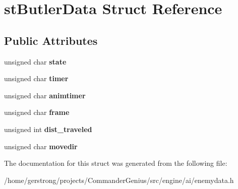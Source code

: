 \hypertarget{structst_butler_data}{
\section{stButlerData Struct Reference}
\label{structst_butler_data}
}
\subsection*{Public Attributes}
\begin{DoxyCompactItemize}
\item 
\hypertarget{structst_butler_data_ad56c17661e5c9b28421bcbd7e271b579}{
unsigned char {\bfseries state}}
\label{structst_butler_data_ad56c17661e5c9b28421bcbd7e271b579}

\item 
\hypertarget{structst_butler_data_af3914f6f6878a60578ace01b501d5973}{
unsigned char {\bfseries timer}}
\label{structst_butler_data_af3914f6f6878a60578ace01b501d5973}

\item 
\hypertarget{structst_butler_data_a2dcdd6d2656d95311bffea2f404c4955}{
unsigned char {\bfseries animtimer}}
\label{structst_butler_data_a2dcdd6d2656d95311bffea2f404c4955}

\item 
\hypertarget{structst_butler_data_ae1639d07feae07a2f63e52548db858a9}{
unsigned char {\bfseries frame}}
\label{structst_butler_data_ae1639d07feae07a2f63e52548db858a9}

\item 
\hypertarget{structst_butler_data_a9b18b251c37b61ed5a40308fa3b20cf2}{
unsigned int {\bfseries dist\_\-traveled}}
\label{structst_butler_data_a9b18b251c37b61ed5a40308fa3b20cf2}

\item 
\hypertarget{structst_butler_data_a336d7bd497c0bf3eb622d381da472cbd}{
unsigned char {\bfseries movedir}}
\label{structst_butler_data_a336d7bd497c0bf3eb622d381da472cbd}

\end{DoxyCompactItemize}


The documentation for this struct was generated from the following file:\begin{DoxyCompactItemize}
\item 
/home/gerstrong/projects/CommanderGenius/src/engine/ai/enemydata.h\end{DoxyCompactItemize}
